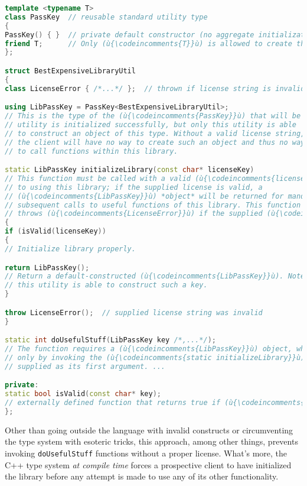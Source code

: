 \begin{lstlisting}[language=C++]
template <typename T>
class PassKey  // reusable standard utility type
{
PassKey() { }  // private default constructor (no aggregate initialization)
friend T;      // Only (ù{\codeincomments{T}}ù) is allowed to create this object.
};

struct BestExpensiveLibraryUtil
{
class LicenseError { /*...*/ };  // thrown if license string is invalid

using LibPassKey = PassKey<BestExpensiveLibraryUtil>;
// This is the type of the (ù{\codeincomments{PassKey}}ù) that will be returned when this
// utility is initialized successfully, but only this utility is able
// to construct an object of this type. Without a valid license string,
// the client will have no way to create such an object and thus no way
// to call functions within this library.

static LibPassKey initializeLibrary(const char* licenseKey)
// This function must be called with a valid (ù{\codeincomments{licenseKey}}ù) string prior
// to using this library; if the supplied license is valid, a
// (ù{\codeincomments{LibPassKey}}ù) *object* will be returned for mandatory use in *all*
// subsequent calls to useful functions of this library. This function
// throws (ù{\codeincomments{LicenseError}}ù) if the supplied (ù{\codeincomments{licenseKey}}ù) string is invalid.
{
if (isValid(licenseKey))
{
// Initialize library properly.

return LibPassKey();
// Return a default-constructed (ù{\codeincomments{LibPassKey}}ù). Note that only
// this utility is able to construct such a key.
}

throw LicenseError();  // supplied license string was invalid
}

static int doUsefulStuff(LibPassKey key /*,...*/);
// The function requires a (ù{\codeincomments{LibPassKey}}ù) object, which can be constructed
// only by invoking the (ù{\codeincomments{static initializeLibrary}}ù) function, to be
// supplied as its first argument. ...

private:
static bool isValid(const char* key);
// externally defined function that returns true if (ù{\codeincomments{key}}ù) is valid
};
\end{lstlisting}

\noindent Other than going outside the language with invalid constructs or circumventing the
type system with esoteric tricks, this approach, among other things,
prevents invoking \texttt{doUsefulStuff} functions without a proper
license. What's more, the C++ type system \emph{at compile time} forces
a prospective client to have initialized the library before any attempt
is made to use any of its other functionality.

